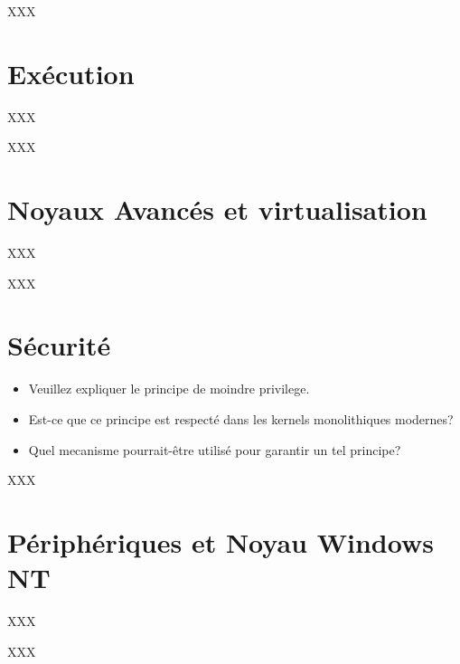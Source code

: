 \begin{correction}

XXX

\end{correction}

%
%

\section{Ex\'ecution
         {\hfill{} }}

XXX

\begin{correction}

XXX

\end{correction}

%
%

\section{Noyaux Avanc\'es et virtualisation
         }

XXX

\begin{correction}

XXX

\end{correction}

% 
%

\section{S\'ecurit\'e
         }


\begin{itemize}
  \item
    Veuillez expliquer le principe de moindre privilege.
  \item
    Est-ce que ce principe est respect\'e dans les kernels monolithiques
    modernes?
  \item
    Quel mecanisme pourrait-\^etre utilis\'e pour garantir un tel principe?
\end{itemize}

\begin{correction}

XXX

\end{correction}

%
%

\section{P\'eriph\'eriques et Noyau Windows NT
         }

XXX

\begin{correction}

XXX

\end{correction}


